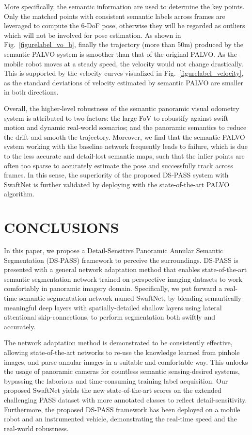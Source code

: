 \documentclass[letterpaper, 10 pt, conference]{ieeeconf}
\begin{document}
More specifically, the semantic information are used to determine the key points. Only the matched points with consistent semantic labels across frames are leveraged to compute the 6-DoF pose, otherwise they will be regarded as outliers which will not be involved for pose estimation. As shown in Fig.~\ref{figurelabel_vo_b}, finally the trajectory (more than 50m) produced by the semantic PALVO system is smoother than that of the original PALVO. As the mobile robot moves at a steady speed, the velocity would not change drastically. This is supported by the velocity curves visualized in Fig.~\ref{figurelabel_velocity}, as the standard deviations of velocity estimated by semantic PALVO are smaller in both directions.

Overall, the higher-level robustness of the semantic panoramic visual odometry system is attributed to two factors: the large FoV to robustify against swift motion and dynamic real-world scenarios; and the panoramic semantics to reduce the drift and smooth the trajectory. Moreover, we find that the semantic PALVO system working with the baseline network frequently leads to failure, which is due to the less accurate and detail-lost semantic maps, such that the inlier points are often too sparse to accurately estimate the pose and successfully track across frames. In this sense, the superiority of the proposed DS-PASS system with SwaftNet is further validated by deploying with the state-of-the-art PALVO algorithm. 

\section{CONCLUSIONS}

In this paper, we propose a Detail-Sensitive Panoramic Annular Semantic Segmentation (DS-PASS) framework to perceive the surroundings.
DS-PASS is presented with a general network adaptation method that enables state-of-the-art semantic segmentation network trained on perspective imaging datasets to work comfortably in panoramic imagery domain. Specifically, we put forward a real-time semantic segmentation network named SwaftNet, by blending semantically-meaningful deep layers with spatially-detailed shallow layers using lateral attentional skip-connections, to perform segmentation both swiftly and accurately. 

The network adaptation method is demonstrated to be consistently effective, allowing state-of-the-art networks to re-use the knowledge learned from pinhole images, and parse annular images in a suitable and comfortable way. This unlocks the usage of panoramic cameras for countless semantic sensing-desired systems, bypassing the laborious and time-consuming training label acquisition. Our proposed SwaftNet yields the new state-of-the-art scores on the extended challenging PASS dataset with more annotated classes to reflect detail-sensitivity. Furthermore, the proposed DS-PASS framework has been deployed on a mobile robot and an instrumented vehicle, demonstrating the real-time speed and the real-world robustness.
\end{document}
